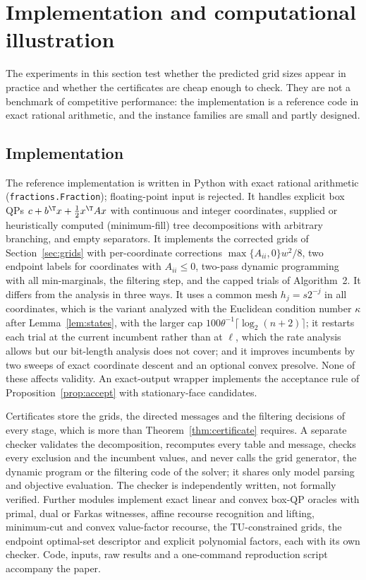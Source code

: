 \section{Implementation and computational illustration}\label{sec:computation}

The experiments in this section test whether the predicted grid sizes appear
in practice and whether the certificates are cheap enough to check. They are
not a benchmark of competitive performance: the implementation is a reference
code in exact rational arithmetic, and the instance families are small and
partly designed.

\subsection{Implementation}
The reference implementation is written in Python with exact rational
arithmetic (\texttt{fractions.Fraction}); floating-point input is rejected. It
handles explicit box QPs $c+b^\T x+\frac12x^\T Ax$ with continuous and integer
coordinates, supplied or heuristically computed (minimum-fill) tree
decompositions with arbitrary branching, and empty separators. It implements
the corrected grids of Section~\ref{sec:grids} with per-coordinate corrections
$\max\{A_{ii},0\}w^2/8$, two endpoint labels for coordinates with $A_{ii}\le0$,
two-pass dynamic programming with all min-marginals, the filtering step, and the
capped trials of Algorithm~2. It differs from the analysis in three ways. It
uses a common mesh $h_j=s2^{-j}$ in all coordinates, which is the variant
analyzed with the Euclidean condition number $\kappa$ after
Lemma~\ref{lem:states}, with the larger cap $100\theta^{-1}\lceil\log_2(n+2)\rceil$;
it restarts each trial at the current incumbent rather than at $\ell$, which
the rate analysis allows but our bit-length analysis does not cover; and it
improves incumbents by two sweeps of exact coordinate descent and an optional
convex presolve. None of these affects validity. An exact-output wrapper
implements the acceptance rule of Proposition~\ref{prop:accept} with
stationary-face candidates.

Certificates store the grids, the directed messages and the filtering
decisions of every stage, which is more than Theorem~\ref{thm:certificate}
requires. A separate checker validates the decomposition, recomputes every
table and message, checks every exclusion and the incumbent values, and never
calls the grid generator, the dynamic program or the filtering code of the
solver; it shares only model parsing and objective evaluation. The checker is
independently written, not formally verified. Further modules implement exact
linear and convex box-QP oracles with primal, dual or Farkas witnesses, affine
recourse recognition and lifting, minimum-cut and convex value-factor
recourse, the TU-constrained grids, the endpoint optimal-set descriptor and
explicit polynomial factors, each with its own checker. Code, inputs, raw
results and a one-command reproduction script accompany the paper.

